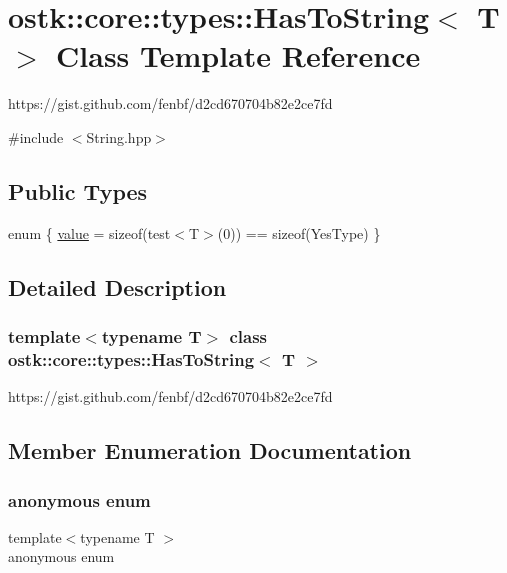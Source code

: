 \hypertarget{classostk_1_1core_1_1types_1_1_has_to_string}{}\section{ostk\+:\+:core\+:\+:types\+:\+:Has\+To\+String$<$ T $>$ Class Template Reference}
\label{classostk_1_1core_1_1types_1_1_has_to_string}


https\+://gist.github.\+com/fenbf/d2cd670704b82e2ce7fd  




{\ttfamily \#include $<$String.\+hpp$>$}

\subsection*{Public Types}
\begin{DoxyCompactItemize}
\item 
enum \{ \hyperlink{classostk_1_1core_1_1types_1_1_has_to_string_af1322ad5dc303d4273e8c60e264c1f2dab24af8591da3b1fe369f1db9f7e44ef6}{value} = sizeof(test$<$T$>$(0)) == sizeof(Yes\+Type)
 \}
\end{DoxyCompactItemize}


\subsection{Detailed Description}
\subsubsection*{template$<$typename T$>$\newline
class ostk\+::core\+::types\+::\+Has\+To\+String$<$ T $>$}

https\+://gist.github.\+com/fenbf/d2cd670704b82e2ce7fd 

\subsection{Member Enumeration Documentation}
\mbox{\label{classostk_1_1core_1_1types_1_1_has_to_string_af1322ad5dc303d4273e8c60e264c1f2d}} 
\subsubsection{\texorpdfstring{anonymous enum}{anonymous enum}}
{\footnotesize\ttfamily template$<$typename T $>$ \\
anonymous enum}

